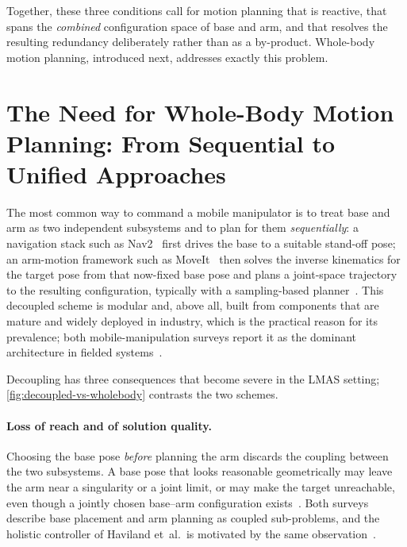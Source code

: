 Together, these three conditions call for motion planning that is
reactive, that spans the \emph{combined} configuration space of base and
arm, and that resolves the resulting redundancy deliberately rather than
as a by-product. Whole-body motion planning, introduced next, addresses
exactly this problem.

\section{The Need for Whole-Body Motion Planning: From Sequential to
  Unified Approaches}
\label{sec:need-wholebody}

The most common way to command a mobile manipulator is to treat base and
arm as two independent subsystems and to plan for them
\emph{sequentially}: a navigation stack such as
Nav2~\cite{Macenski2020Nav2} first drives the base to a suitable
stand-off pose; an arm-motion framework such as
MoveIt~\cite{moveit2} then solves the inverse kinematics for the target
\ee{} pose from that now-fixed base pose and plans a joint-space
trajectory to the resulting configuration, typically with a
sampling-based planner~\cite{Sucan2012OMPL}. This decoupled scheme is
modular and, above all, built from components that are mature and
widely deployed in industry, which is the practical reason for its
prevalence; both mobile-manipulation surveys report it as the dominant
architecture in fielded
systems~\cite{Sandakalum2022Survey,Thakar2023MobileManip}.

Decoupling has three consequences that become severe in the LMAS
setting; \cref{fig:decoupled-vs-wholebody} contrasts the two schemes.

\paragraph{Loss of reach and of solution quality.}
Choosing the base pose \emph{before} planning the arm discards the
coupling between the two subsystems. A base pose that looks reasonable
geometrically may leave the arm near a singularity or a joint limit, or
may make the \ee{} target unreachable, even though a jointly chosen
base--arm configuration
exists~\cite{Sandakalum2022Survey,Thakar2023MobileManip}. Both surveys
describe base placement and arm planning as coupled sub-problems, and
the holistic controller of Haviland et~al.\ is motivated by the same
observation~\cite{Haviland2022Holistic}.

